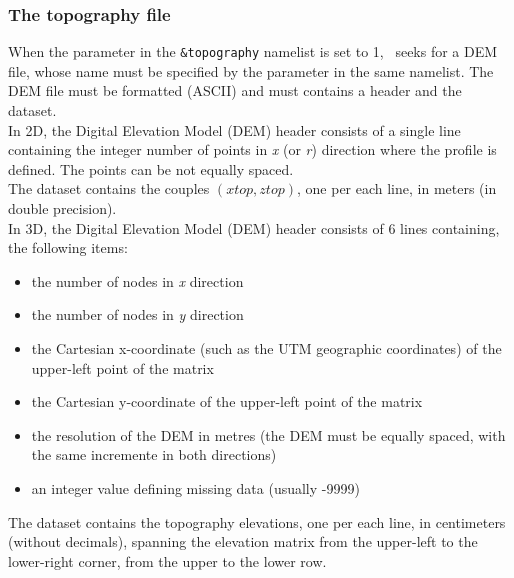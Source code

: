 \subsubsection{The topography file}
When the  parameter in the 
{\tt \&topography} namelist is set to 1, \PDAC\
seeks for a DEM file, whose name must be specified by
the parameter  in the same namelist.
The DEM file must be formatted (ASCII) and must contains
a header and the dataset.\\
In 2D, the Digital Elevation Model (DEM) header consists of a single line
containing the integer number of points in {\it x} (or {\it r}) direction where
the profile is defined. The points can be not equally spaced.\\
The dataset contains the couples $(xtop,ztop)$, one per each line, in meters
(in double precision).\\
In 3D, the Digital Elevation Model (DEM) header consists of 6 lines containing,
the following items:
\begin{itemize}
\item the number of nodes in {\it x} direction
\item  the number of nodes in {\it y} direction
\item  the Cartesian x-coordinate (such as the UTM geographic coordinates) of the upper-left point of the matrix
\item  the Cartesian y-coordinate of the upper-left point of the matrix
\item  the resolution of the DEM in metres (the DEM must be equally spaced, with the same incremente in both directions)
\item an integer value defining missing data (usually -9999)
\end{itemize}
The dataset contains the topography elevations, one per each line, in
centimeters (without decimals), spanning the elevation matrix
from the upper-left to the lower-right corner, from the upper to the lower
row.

